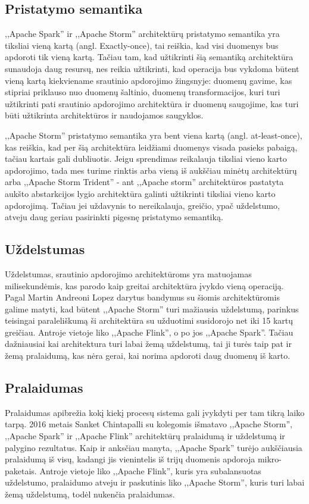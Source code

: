 \documentclass{VUMIFPSkursinis}
\begin{document}
\subsection{Pristatymo semantika}
    ,,Apache Spark'' ir ,,Apache Storm'' architektūrų pristatymo semantika yra tiksliai vieną kartą (angl. Exactly-once), tai reiškia, kad visi 
duomenys bus apdoroti tik vieną kartą. Tačiau tam, kad užtikrinti šią semantiką architektūra sunaudoja daug resursų, nes reikia užtikrinti, kad 
operacija bus vykdoma būtent vieną kartą kiekviename srautinio apdorojimo žingsnyje: duomenų gavime, kas stipriai priklauso nuo duomenų šaltinio,
duomenų transformacijos, kuri turi užtikrinti pati srautinio apdorojimo architektūra ir duomenų saugojime, kas turi būti užtikrinta architektūros ir
naudojamos saugyklos\cite{zhang20}.\par
    ,,Apache Storm'' pristatymo semantika yra bent viena kartą (angl. at-least-once), kas reiškia, kad per šią architektūra leidžiami duomenys 
visada pasieks pabaigą, tačiau kartais gali dubliuotis\cite{prithi20}. Jeigu sprendimas reikalauja tiksliai vieno karto apdorojimo, tada mes turime rinktis arba vieną 
iš aukščiau minėtų architektūrų arba ,,Apache Storm Trident'' - ant ,,Apache storm'' architektūros pastatyta aukšto abstarkcijos lygio architektūra 
galinti užtikrinti tiksliai vieno karto apdorojimą. Tačiau jei uždavynis to nereikalauja, greičio, ypač uždelstumo, atveju daug geriau pasirinkti 
pigesnę pristatymo semantiką\cite{zhang20}.
\subsection{Uždelstumas}
    Uždelstumas, srautinio apdorojimo architektūroms yra matuojamas milisekundėmis, kas parodo kaip greitai architektūra įvykdo vieną operaciją. 
Pagal Martin Andreoni Lopez darytus bandymus su šiomis architektūromis galime matyti, kad būtent ,,Apache Storm'' turi mažiausia uždelstumą,
parinkus teisingai paraleliškumą ši architektūra su užduotimi susidorojo net iki 15 kartų greičiau. Antroje vietoje liko ,,Apache Flink'', o po jos
,,Apache Spark''\cite{Lopez2016APC}. Tačiau dažniausiai kai architektura turi labai žemą uždelstumą, tai ji turės taip pat ir žemą pralaidumą, kas nėra gerai, kai norima
apdoroti daug duomenų iš karto.
\subsection{Pralaidumas}
    Pralaidumas apibrežia kokį kiekį procesų sistema gali įvykdyti per tam tikrą laiko tarpą. 2016 metais Sanket Chintapalli su kolegomis išmatavo ,,Apache Storm'',
,,Apache Spark'' ir ,,Apache Flink'' architektūrų pralaidumą ir uždelstumą ir palygino rezultatus. Kaip ir anksčiau manyta, ,,Apache Spark'' turėjo aukščiausia 
pralaidumą iš visų, kadangi jis vienintelis iš trijų duomenis apdoroja mikro-paketais. Antroje vietoje liko ,,Apache Flink'', kuris yra subalansuotas uždelstumo,
pralaidumo atveju ir paskutinis liko ,,Apache Storm'', kuris turi labai žemą uždelstumą, todėl nukenčia pralaidumas\cite{chintapalli2016benchmarking}.
\end{document}
